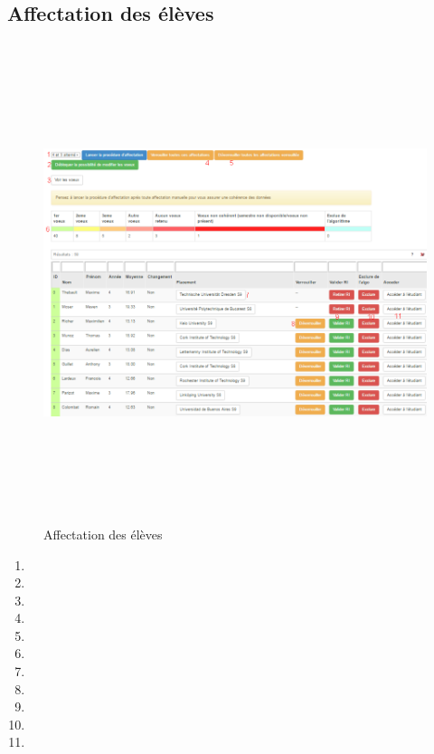     \subsection{Affectation des élèves}
    \label{ae}
    \begin{figure}[H]
    	\centering
    	\includegraphics[width=16cm,height=14cm]{Images/Admin/moulinette_admin.png}
    	\caption{Affectation des élèves}
    	
    \end{figure}
             \begin{enumerate}
             	\item
             	\item
             	\item
             	\item
             	\item
             	\item
             	\item
             	\item
             	\item
             	\item
             	\item
             \end{enumerate}
    
